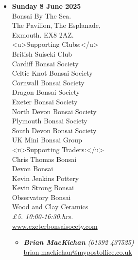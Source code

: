 \begin{itemize}
    \item \textbf{Sunday 8 June 2025}
    \\
    Bonsai By The Sea. \\
    The Pavilion, The Esplanade, \\
    Exmouth. EX8 2AZ. \\
    <u>Supporting Clubs:</u> \\
    British Suiseki Club \\
    Cardiff Bonsai Society \\
    Celtic Knot Bonsai Society \\
    Cornwall Bonsai Society \\
    Dragon Bonsai Society \\
    Exeter Bonsai Society \\
    North Devon Bonsai Society \\
    Plymouth Bonsai Society \\
    South Devon Bonsai Society \\
    UK Mini Bonsai Group \\
    <u>Supporting Traders:</u> \\
    Chris Thomas Bonsai \\
    Devon Bonsai \\
    Kevin Jenkins Pottery \\
    Kevin Strong Bonsai \\
    Observatory Bonsai \\
    Wood and Clay Ceramics
    \\
    \emph{£5. 10:00-16:30.hrs.}
    \\
    \href{http://www.exeterbonsaisocety.com/}{www.exeterbonsaisocety.com}
    \begin{itemize}
        \item \textbf{\emph{Brian MacKichan}} \emph{(01392 437525)} \\
        \href{mailto:brian.mackichan@mypostoffice.co.uk}{brian.mackichan@mypostoffice.co.uk} 
    \end{itemize}


\end{itemize}
